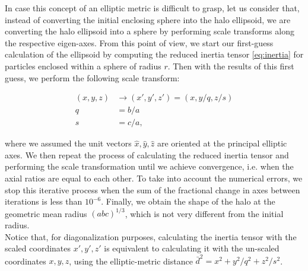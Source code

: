 In case this concept of an elliptic metric is difficult to grasp, let us consider that, instead of converting the initial enclosing sphere into the halo ellipsoid, we are converting the halo ellipsoid into a sphere by performing scale transforms along the respective eigen-axes. From this point of view, we start our first-guess calculation of the ellipsoid by computing the reduced inertia tensor \eqref{eq:inertia} for particles enclosed within a sphere of radius $r$. Then with the results of this first guess, we perform the following scale transform:
  
\begin{align}
(x,y,z) &\rightarrow (x',y',z')=(x,y/q,z/s) \label{eq:scale}\\
q &=  b/a \nonumber \\
s &= c/a \nonumber ,
\end{align}

where we assumed the unit vectors $\hat{x},\hat{y},\hat{z}$ are oriented at the principal elliptic axes. We then repeat the process of calculating the reduced inertia tensor and performing the scale transformation until we achieve convergence, i.e. when the axial ratios are equal to each other. To take into account the numerical errors, we stop this iterative process when the sum of the fractional change in axes between iterations is less than $10^{-6}$. Finally, we obtain the shape of the halo at the geometric mean radius $(abc)^{1/3}$, which is not very different from the initial radius.\\

Notice that, for diagonalization purposes, calculating the inertia tensor with the scaled coordinates $x',y',z'$ is equivalent to calculating it with the un-scaled coordinates $x,y,z$, using the elliptic-metric distance $\bar{d}^2 = x^2+y^2/q^2+z^2/s^2$.\\






